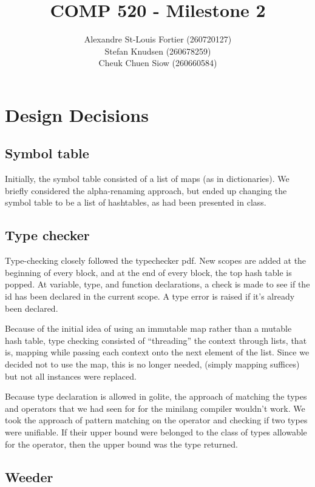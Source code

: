 \documentclass{article}
\begin{document}
\pagestyle{empty}

\title{COMP 520 - Milestone 2}
\author{
Alexandre St-Louis Fortier (260720127)\\
Stefan Knudsen (260678259)\\
Cheuk Chuen Siow (260660584)}
\maketitle

\raggedright
\section*{Design Decisions}
\subsection*{Symbol table}
Initially, the symbol table consisted of a list of maps (as in dictionaries). We briefly considered the alpha-renaming approach, but ended up changing the symbol table to be a list of hashtables, as had been presented in class.

\subsection*{Type checker}
Type-checking closely followed the typechecker pdf.
New scopes are added at the beginning of every block, and at the end of every block, the top hash table is popped.
At variable, type, and function declarations, a check is made to see if the id has been declared in the current scope. A type error is raised if it's already been declared.

Because of the initial idea of using an immutable map rather than a mutable hash table, type checking consisted of ``threading'' the context through lists, that is, mapping while passing each context onto the next element of the list. Since we decided not to use the map, this is no longer needed, (simply mapping suffices) but not all instances were replaced.

Because type declaration is allowed in golite, the approach of matching the types and operators that we had seen for for the minilang compiler wouldn't work. We took the approach of pattern matching on the operator and checking if two types were unifiable. If their upper bound were belonged to the class of types allowable for the operator, then the upper bound was the type returned.


\subsection*{Weeder}
\end{document}
